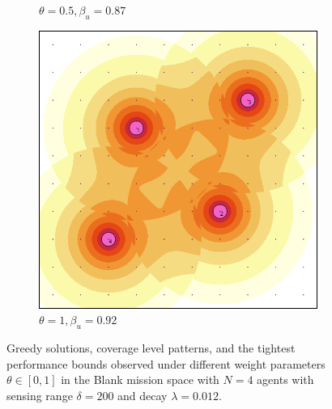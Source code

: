 \documentclass[letterpaper, 10 pt, conference]{ieeeconf}
\begin{document}
\begin{figure}[!t]
\begin{subfigure}[t]{0.32\columnwidth}
        \caption{$\theta = 0.5,\beta_u=0.87$}
    \end{subfigure}%
    \hfill
    \begin{subfigure}[t]{0.32\columnwidth}
        \centering
        \includegraphics[width=0.9\columnwidth]{Figures/DetFun_100.png}
        \caption{$\theta = 1, \beta_u=0.92$}
    \end{subfigure}%
    \vspace{-2mm}
    \caption{Greedy solutions, coverage level patterns, and the tightest performance bounds observed under different weight parameters $\theta \in [0,1]$ in the Blank mission space with $N=4$ agents with sensing range $\delta=200$ and decay $\lambda = 0.012$.}
    \label{Fig:DetectionFunction}
    \vspace{-3mm}
\end{figure}
\end{document}
